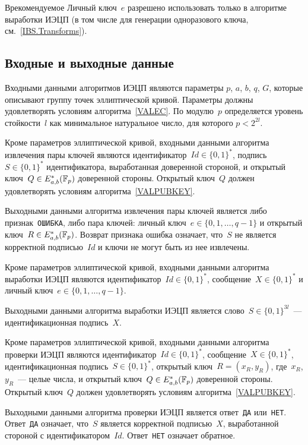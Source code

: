\begin{appendix}{В}{рекомендуемое}
Личный ключ~$e$ разрешено использовать только 
в алгоритме выработки ИЭЦП
(в том числе для генерации одноразового ключа, 
см.~\ref{IBS.Transforms}).

\label{IBS.Algs}

\subsection{Входные и выходные данные}

Входными данными алгоритмов ИЭЦП являются 
параметры $p$, $a$, $b$, $q$, $G$, которые описывают группу 
точек эллиптической кривой.
Параметры должны удовлетворять условиям алгоритма~\ref{VALEC}. 
По модулю~$p$ определяется уровень стойкости~$l$ как минимальное 
натуральное число, для которого $p<2^{2l}$.

Кроме параметров эллиптической кривой,
входными данными алгоритма извлечения пары ключей
являются идентификатор~$Id\in\{0,1\}^*$,
подпись~$S\in\{0,1\}^*$ идентификатора, 
выработанная доверенной стороной, 
и открытый ключ~$Q\in E_{a,b}^*(\mathbb{F}_p)$ доверенной стороны.
%
Открытый ключ~$Q$ должен удовлетворять условиям
алгоритма~\ref{VALPUBKEY}.

Выходными данными алгоритма извлечения пары ключей
является либо признак~\texttt{ОШИБКА}, либо пара ключей:
личный ключ~$e\in\{0,1,\ldots,q-1\}$ и 
открытый ключ~$R\in E_{a,b}^*(\mathbb{F}_p)$.
%
Возврат признака ошибка означает, что~$S$ 
не является корректной подписью~$Id$ и ключи 
не могут быть из нее извлечены.

Кроме параметров эллиптической кривой,
входными данными алгоритма выработки ИЭЦП
являются 
идентификатор~$Id\in\{0,1\}^*$,
сообщение~$X\in\{0,1\}^*$
и личный ключ~$e\in\{0,1,\ldots,q-1\}$.

Выходными данными алгоритма выработки ИЭЦП
является слово~$S\in\{0,1\}^{3l}$~--- 
идентификационная подпись~$X$.

Кроме параметров эллиптической кривой,
входными данными алгоритма проверки ИЭЦП
являются идентификатор~$Id\in\{0,1\}^*$, 
сообщение~$X\in\{0,1\}^*$,
идентификационная подпись~$S\in\{0,1\}^*$, 
открытый ключ~$R=(x_R,y_R)$, где~$x_R$, $y_R$~--- целые числа, 
и открытый ключ~$Q\in E_{a,b}^*(\mathbb{F}_p)$ доверенной стороны.
%
Открытый ключ~$Q$ должен удовлетворять условиям
алгоритма~\ref{VALPUBKEY}.

Выходными данными алгоритма проверки ИЭЦП
является ответ~\texttt{ДА} или~\texttt{НЕТ}.
Ответ~\texttt{ДА} означает, что~$S$ 
является корректной подписью~$X$,
выработанной стороной с идентификатором~$Id$.
Ответ~\texttt{НЕТ} означает обратное.


\end{appendix}
